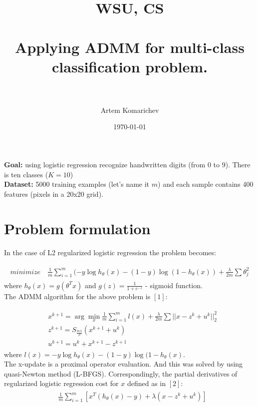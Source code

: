 \documentclass[paper=a4, fontsize=11pt]{scrartcl} %
\title{	
\normalfont \normalsize 
\textsc{WSU, CS} \\ [25pt] %
\horrule{0.5pt} \\[0.4cm] %
\huge Applying ADMM for multi-class classification problem. \\ %
\horrule{2pt} \\[0.5cm] %
}
\author{Artem Komarichev} %
\date{\normalsize\today} %
\numberwithin{equation}{section} %
\numberwithin{figure}{section} %
\numberwithin{table}{section} %
\begin{document}
\maketitle %



\textbf{Goal:} using logistic regression recognize handwritten digits (from 0 to 9). There is ten classes ($K=10$) \\

\textbf{Dataset:} 5000 training examples (let's name it $m$) and each sample contains 400 features (pixels in a 20x20 grid).

\section{Problem formulation} 
In the case of L2 regularized logistic regression the problem becomes:

\begin{align} 
\begin{split}
	minimize \quad \frac{1}{m} \sum_{i=1}^{m}(-y \log h_{\theta}(x)-(1-y)\log (1-h_{\theta}(x)) + \frac{\lambda}{2m} \sum \theta_j^2
\end{split}					
\end{align} 
where $h_{\theta}(x) = g(\theta^Tx)$ and $g(z)=\frac{1}{1+e^{-z}}$ - sigmoid function. \\

The ADMM algorithm for the above problem is $[1]$:

\begin{align} 
\begin{split}
	& x^{k+1} = \arg\min_{x} \frac{1}{m} \sum_{i=1}^{m}l(x) + \frac{\lambda}{2m} \sum ||x-z^k+u^k||_2^2 \\
	& z^{k+1} = S_{\frac{m\lambda}{\rho}}(x^{k+1}+u^k) \\
	& u^{k+1} = u^k + x^{k+1} - z^{k+1}
\end{split}					
\end{align} 
where $l(x) = -y \log h_{\theta}(x)-(1-y)\log (1-h_{\theta}(x)$.\\

The x-update is a proximal operator evaluation. And this was solved by using quasi-Newton method (L-BFGS). Correspondingly, the partial derivatives of regularized logistic regression cost for $x$ defined as in $[2]$: 
\begin{align} 
\begin{split}
	& \frac{1}{m} \sum_{i=1}^{m}[x^T(h_{\theta}(x)-y) + \lambda (x-z^k+u^k)] \\
\end{split}					
\end{align}
\\
\end{document}
